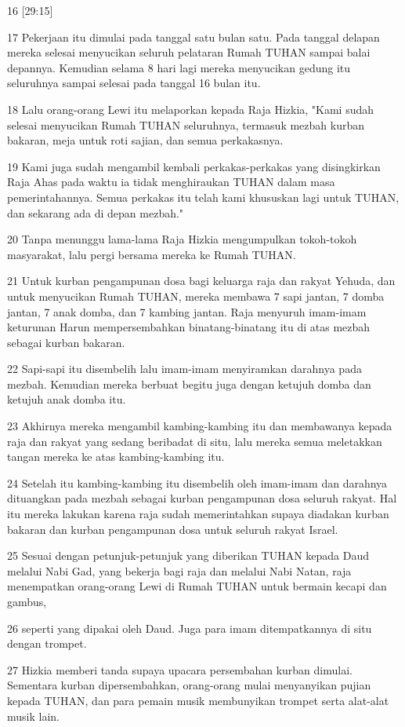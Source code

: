 \par 16 [29:15]
\par 17 Pekerjaan itu dimulai pada tanggal satu bulan satu. Pada tanggal delapan mereka selesai menyucikan seluruh pelataran Rumah TUHAN sampai balai depannya. Kemudian selama 8 hari lagi mereka menyucikan gedung itu seluruhnya sampai selesai pada tanggal 16 bulan itu.
\par 18 Lalu orang-orang Lewi itu melaporkan kepada Raja Hizkia, "Kami sudah selesai menyucikan Rumah TUHAN seluruhnya, termasuk mezbah kurban bakaran, meja untuk roti sajian, dan semua perkakasnya.
\par 19 Kami juga sudah mengambil kembali perkakas-perkakas yang disingkirkan Raja Ahas pada waktu ia tidak menghiraukan TUHAN dalam masa pemerintahannya. Semua perkakas itu telah kami khususkan lagi untuk TUHAN, dan sekarang ada di depan mezbah."
\par 20 Tanpa menunggu lama-lama Raja Hizkia mengumpulkan tokoh-tokoh masyarakat, lalu pergi bersama mereka ke Rumah TUHAN.
\par 21 Untuk kurban pengampunan dosa bagi keluarga raja dan rakyat Yehuda, dan untuk menyucikan Rumah TUHAN, mereka membawa 7 sapi jantan, 7 domba jantan, 7 anak domba, dan 7 kambing jantan. Raja menyuruh imam-imam keturunan Harun mempersembahkan binatang-binatang itu di atas mezbah sebagai kurban bakaran.
\par 22 Sapi-sapi itu disembelih lalu imam-imam menyiramkan darahnya pada mezbah. Kemudian mereka berbuat begitu juga dengan ketujuh domba dan ketujuh anak domba itu.
\par 23 Akhirnya mereka mengambil kambing-kambing itu dan membawanya kepada raja dan rakyat yang sedang beribadat di situ, lalu mereka semua meletakkan tangan mereka ke atas kambing-kambing itu.
\par 24 Setelah itu kambing-kambing itu disembelih oleh imam-imam dan darahnya dituangkan pada mezbah sebagai kurban pengampunan dosa seluruh rakyat. Hal itu mereka lakukan karena raja sudah memerintahkan supaya diadakan kurban bakaran dan kurban pengampunan dosa untuk seluruh rakyat Israel.
\par 25 Sesuai dengan petunjuk-petunjuk yang diberikan TUHAN kepada Daud melalui Nabi Gad, yang bekerja bagi raja dan melalui Nabi Natan, raja menempatkan orang-orang Lewi di Rumah TUHAN untuk bermain kecapi dan gambus,
\par 26 seperti yang dipakai oleh Daud. Juga para imam ditempatkannya di situ dengan trompet.
\par 27 Hizkia memberi tanda supaya upacara persembahan kurban dimulai. Sementara kurban dipersembahkan, orang-orang mulai menyanyikan pujian kepada TUHAN, dan para pemain musik membunyikan trompet serta alat-alat musik lain.
